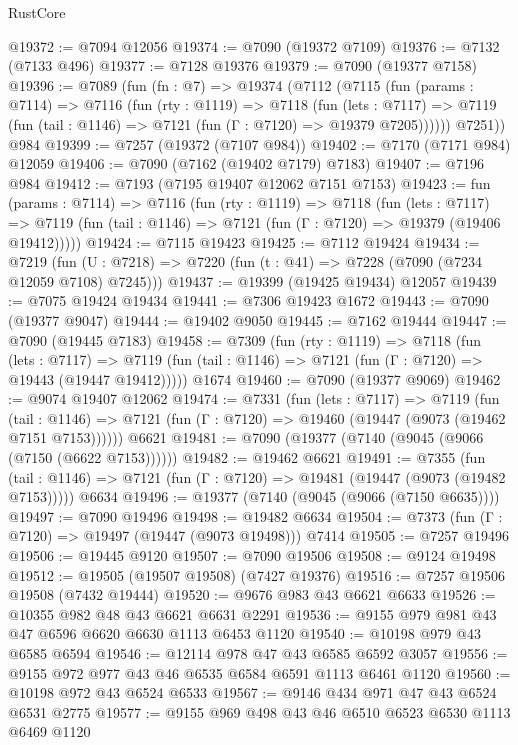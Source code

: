 \begin{lexlean}{RustCore}
\begin{coremodule}
@19372 := @7094 @12056
@19374 := @7090 (@19372 @7109)
@19376 := @7132 (@7133 @496)
@19377 := @7128 @19376
@19379 := @7090 (@19377 @7158)
@19396 := @7089
    (fun (fn : @7) =>
    @19374
      (@7112
        (@7115
          (fun (params : @7114) =>
          @7116
            (fun (rty : @1119) =>
            @7118
              (fun (lets : @7117) =>
              @7119 (fun (tail : @1146) => @7121 (fun (Γ : @7120) => @19379 @7205))))))
        @7251))
    @984
@19399 := @7257 (@19372 (@7107 @984))
@19402 := @7170 (@7171 @984) @12059
@19406 := @7090 (@7162 (@19402 @7179) @7183)
@19407 := @7196 @984
@19412 := @7193 (@7195 @19407 @12062 @7151 @7153)
@19423 := fun (params : @7114) =>
  @7116
    (fun (rty : @1119) =>
    @7118
      (fun (lets : @7117) =>
      @7119 (fun (tail : @1146) => @7121 (fun (Γ : @7120) => @19379 (@19406 @19412)))))
@19424 := @7115 @19423
@19425 := @7112 @19424
@19434 := @7219
    (fun (U : @7218) => @7220 (fun (t : @41) => @7228 (@7090 (@7234 @12059 @7108) @7245)))
@19437 := @19399 (@19425 @19434) @12057
@19439 := @7075 @19424 @19434
@19441 := @7306 @19423 @1672
@19443 := @7090 (@19377 @9047)
@19444 := @19402 @9050
@19445 := @7162 @19444
@19447 := @7090 (@19445 @7183)
@19458 := @7309
    (fun (rty : @1119) =>
    @7118
      (fun (lets : @7117) =>
      @7119 (fun (tail : @1146) => @7121 (fun (Γ : @7120) => @19443 (@19447 @19412)))))
    @1674
@19460 := @7090 (@19377 @9069)
@19462 := @9074 @19407 @12062
@19474 := @7331
    (fun (lets : @7117) =>
    @7119
      (fun (tail : @1146) =>
      @7121 (fun (Γ : @7120) => @19460 (@19447 (@9073 (@19462 @7151 @7153))))))
    @6621
@19481 := @7090 (@19377 (@7140 (@9045 (@9066 (@7150 (@6622 @7153))))))
@19482 := @19462 @6621
@19491 := @7355
    (fun (tail : @1146) => @7121 (fun (Γ : @7120) => @19481 (@19447 (@9073 (@19482 @7153)))))
    @6634
@19496 := @19377 (@7140 (@9045 (@9066 (@7150 @6635))))
@19497 := @7090 @19496
@19498 := @19482 @6634
@19504 := @7373 (fun (Γ : @7120) => @19497 (@19447 (@9073 @19498))) @7414
@19505 := @7257 @19496
@19506 := @19445 @9120
@19507 := @7090 @19506
@19508 := @9124 @19498
@19512 := @19505 (@19507 @19508) (@7427 @19376)
@19516 := @7257 @19506 @19508 (@7432 @19444)
@19520 := @9676 @983 @43 @6621 @6633
@19526 := @10355 @982 @48 @43 @6621 @6631 @2291
@19536 := @9155 @979 @981 @43 @47 @6596 @6620 @6630 @1113 @6453 @1120
@19540 := @10198 @979 @43 @6585 @6594
@19546 := @12114 @978 @47 @43 @6585 @6592 @3057
@19556 := @9155 @972 @977 @43 @46 @6535 @6584 @6591 @1113 @6461 @1120
@19560 := @10198 @972 @43 @6524 @6533
@19567 := @9146 @434 @971 @47 @43 @6524 @6531 @2775
@19577 := @9155 @969 @498 @43 @46 @6510 @6523 @6530 @1113 @6469 @1120

\end{coremodule}
\end{lexlean}
